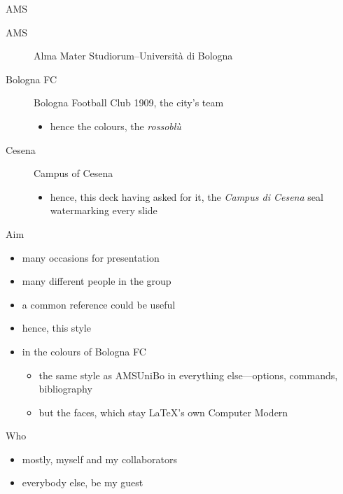 \documentclass[presentation,cesena,apice]{beamer}\mode<presentation>{\usetheme{AMSBolognaFC}}
\begin{document}
\begin{frame}[c]{AMS}
%
\begin{description}
	\item[AMS] Alma Mater Studiorum--Università di Bologna
	\item[Bologna FC] Bologna Football Club 1909, the city's team
	\begin{itemize}
		\item hence the colours, the \textcolor{bolognafcred}{\textit{rosso}}\textcolor{bolognafcblue}{\textit{bl\`u}}
	\end{itemize}
	\item[Cesena] Campus of Cesena
	\begin{itemize}
		\item hence, this deck having asked for it, the \emph{Campus di Cesena} seal watermarking every slide
	\end{itemize}
\end{description}
%
\end{frame}

\begin{frame}[c]{Aim}
%
\begin{itemize}
	\item many occasions for presentation
	\item many different people in the group
	\item a common reference could be useful
	\item hence, this style
	\item in the colours of Bologna FC
	\begin{itemize}
		\item the same style as \alert{AMSUniBo} in everything else---options, commands, bibliography
		\item but the faces, which stay \LaTeX{}'s own Computer Modern
	\end{itemize}
\end{itemize}
%
\end{frame}

\begin{frame}[c]{Who}
%
\begin{itemize}
	\item mostly, myself and my collaborators
	\item everybody else, be my guest
\end{itemize}
%
\end{frame}
\end{document}
